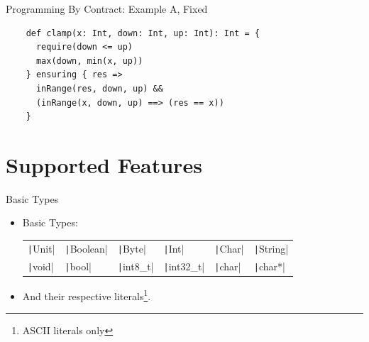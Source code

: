 \documentclass[xcolor={usenames,dvipsnames}]{beamer}
\newcommand{\InlineC}[1]{\texttt|#1|}
\newcommand{\InlineS}[1]{\texttt|#1|}
\begin{document}
\begin{frame}[fragile]{Programming By Contract: Example A, Fixed}

  \begin{verbatim}
    def clamp(x: Int, down: Int, up: Int): Int = {
      require(down <= up)
      max(down, min(x, up))
    } ensuring { res =>
      inRange(res, down, up) &&
      (inRange(x, down, up) ==> (res == x))
    }
  \end{verbatim}

\end{frame}



\section{Supported Features}

\begin{frame}[fragile]{Basic Types}

  \begin{itemize}

    \item Basic Types:\\
      \begin{tabular}{llllll}
        \InlineS{Unit} & \InlineS{Boolean} & \InlineS{Byte}   & \InlineS{Int}     & \InlineS{Char} & \InlineS{String} \\
        \InlineC{void} & \InlineC{bool}    & \InlineC{int8_t} & \InlineC{int32_t} & \InlineC{char} & \InlineC{char*}
      \end{tabular}

    \item And their respective literals\footnote{ASCII literals only}.

  \end{itemize}

\end{frame}
\end{document}
